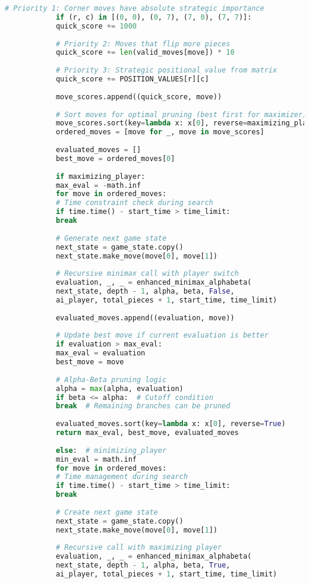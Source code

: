 \documentclass[12pt]{article}
\newenvironment{ltrcode}{\lr\bgroup}{\egroup}
\begin{document}
\begin{ltrcode}
\begin{lstlisting}[language=Python, caption=Complete Enhanced Minimax with Alpha-Beta Pruning]
			# Priority 1: Corner moves have absolute strategic importance
			if (r, c) in [(0, 0), (0, 7), (7, 0), (7, 7)]:
			quick_score += 1000
			
			# Priority 2: Moves that flip more pieces
			quick_score += len(valid_moves[move]) * 10
			
			# Priority 3: Strategic positional value from matrix
			quick_score += POSITION_VALUES[r][c]
			
			move_scores.append((quick_score, move))
			
			# Sort moves for optimal pruning (best first for maximizer)
			move_scores.sort(key=lambda x: x[0], reverse=maximizing_player)
			ordered_moves = [move for _, move in move_scores]
			
			evaluated_moves = []
			best_move = ordered_moves[0]
			
			if maximizing_player:
			max_eval = -math.inf
			for move in ordered_moves:
			# Time constraint check during search
			if time.time() - start_time > time_limit:
			break
			
			# Generate next game state
			next_state = game_state.copy()
			next_state.make_move(move[0], move[1])
			
			# Recursive minimax call with player switch
			evaluation, _, _ = enhanced_minimax_alphabeta(
			next_state, depth - 1, alpha, beta, False, 
			ai_player, total_pieces + 1, start_time, time_limit)
			
			evaluated_moves.append((evaluation, move))
			
			# Update best move if current evaluation is better
			if evaluation > max_eval:
			max_eval = evaluation
			best_move = move
			
			# Alpha-Beta pruning logic
			alpha = max(alpha, evaluation)
			if beta <= alpha:  # Cutoff condition
			break  # Remaining branches can be pruned
			
			evaluated_moves.sort(key=lambda x: x[0], reverse=True)
			return max_eval, best_move, evaluated_moves
			
			else:  # minimizing_player
			min_eval = math.inf
			for move in ordered_moves:
			# Time management during search
			if time.time() - start_time > time_limit:
			break
			
			# Create next game state
			next_state = game_state.copy()
			next_state.make_move(move[0], move[1])
			
			# Recursive call with maximizing player
			evaluation, _, _ = enhanced_minimax_alphabeta(
			next_state, depth - 1, alpha, beta, True, 
			ai_player, total_pieces + 1, start_time, time_limit)
			

\end{lstlisting}
\end{ltrcode}
\end{document}
